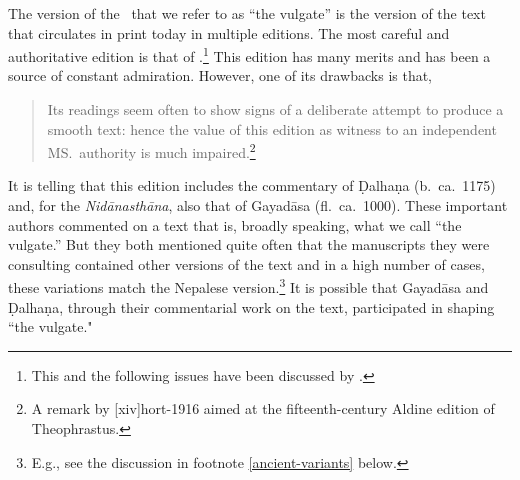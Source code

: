 The version of the \SS\ that we refer to as “the vulgate” is the
version of the text that circulates in print today in multiple
editions.  The most careful and authoritative edition is that of
\citet{vulgate}.\footnote{This and the following issues have been
    discussed by \citet[2 and ch.\,3]{wuja-2023}.}  This edition has many merits 
    and has been a source of constant admiration. However, one of its drawbacks 
    is that, 
    \begin{quote}
        Its readings seem often to show signs of a deliberate attempt
to produce a smooth text: hence the value of this edition as
witness to an independent MS.\ authority is much
impaired.\footnote{A remark by [xiv]{hort-1916} aimed
    at the fifteenth-century Aldine edition of Theophrastus.}
    \end{quote}  It is telling that
    this edition includes the commentary of Ḍalhaṇa (b.\ ca.\ 1175) and,
    for the \emph{Nidānasthāna}, also that of Gayadāsa (fl.\ ca.\ 1000).
    These important authors commented on a text that is, broadly speaking,
    what we call “the vulgate.”  But they both mentioned quite often that
    the manuscripts they were consulting contained other versions of the
    text and in a high number of cases, these variations match the
    Nepalese version.\footnote{E.g., see the discussion in footnote
        \ref{ancient-variants} below.}  It is possible that Gayadāsa  and Ḍalhaṇa,
        through their commentarial work on the text, participated in shaping
        “the vulgate."


